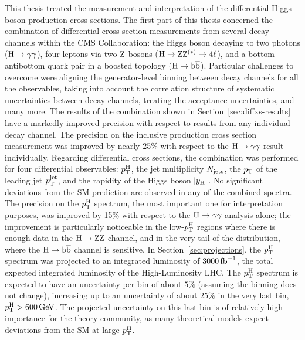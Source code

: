 This thesis treated the measurement and interpretation of the differential Higgs boson production cross sections.
% 
The first part of this thesis concerned the combination of differential cross section measurements from several decay channels within the CMS Collaboration: the Higgs boson decaying to two photons ($\mathrm{H}\to\mathrm{\gamma}\mathrm{\gamma}$), four leptons via two $\mathrm{Z}$ bosons ($\mathrm{H}\to\mathrm{Z}\mathrm{Z}^{(\ast)}\to 4\ell$), and a bottom-antibottom quark pair in a boosted topology ($\mathrm{H}\to\mathrm{b}\overline{\mathrm{b}}$).
% 
Particular challenges to overcome were aligning the generator-level binning between decay channels for all the observables, taking into account the correlation structure of systematic uncertainties between decay channels, treating the acceptance uncertainties, and many more.
% 
The results of the combination shown in Section~\ref{sec:diffxs-results} have a markedly improved precision with respect to results from any individual decay channel.
% 
The precision on the inclusive production cross section measurement was improved by nearly 25\% with respect to the $\mathrm{H}\to\mathrm{\gamma}\mathrm{\gamma}$ result individually.
% 
Regarding differential cross sections, the combination was performed for four differential observables: $p_\mathrm{T}^\mathrm{H}$, the jet multiplicity $N_\text{jets} $, the $p_\mathrm{T}$ of the leading jet $p_\mathrm{T}^\text{jet} $, and the rapidity of the Higgs boson $\left|y_\mathrm{H}\right| $.
% 
No significant deviations from the SM prediction are observed in any of the combined spectra.
% 
The precision on the $p_\mathrm{T}^\mathrm{H}$ spectrum, the most important one for interpretation purposes, was improved by 15\% with respect to the $\mathrm{H}\to\mathrm{\gamma}\mathrm{\gamma}$ analysis alone; the improvement is particularly noticeable in the low-$p_\mathrm{T}^\mathrm{H}$ regions where there is enough data in the $\mathrm{H}\to\mathrm{Z}\mathrm{Z}$ channel, and in the very tail of the distribution, where the $\mathrm{H}\to\mathrm{b}\overline{\mathrm{b}}$ channel is sensitive.
% 
In Section~\ref{sec:projections}, the $p_\mathrm{T}^\mathrm{H}$ spectrum was projected to an integrated luminosity of $3000\,\text{fb}^{-1}$, the total expected integrated luminosity of the High-Luminosity LHC.
% 
The $p_\mathrm{T}^\mathrm{H}$ spectrum is expected to have an uncertainty per bin of about $5\%$ (assuming the binning does not change), increasing up to an uncertainty of about $25\%$ in the very last bin, $p_\mathrm{T}^\mathrm{H} > 600\,\text{GeV}$.
% 
The projected uncertainty on this last bin is of relatively high importance for the theory community, as many theoretical models expect deviations from the SM at large $p_\mathrm{T}^\mathrm{H}$.


